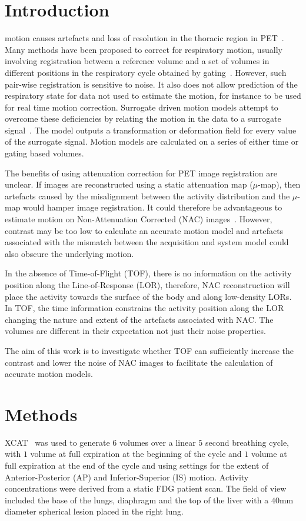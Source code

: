 \documentclass{IEEEtran}
\begin{document}
\section{Introduction}
 motion causes artefacts and loss of resolution in the thoracic region in PET~\cite{Nehmeh2008}. Many methods have been proposed to correct for respiratory motion, usually involving registration between a reference volume and a set of volumes in different positions in the respiratory cycle obtained by gating~\cite{Oliveira2014}. However, such pair-wise registration is sensitive to noise. It also does not allow prediction of the respiratory state for data not used to estimate the motion, for instance to be used for real time motion correction. Surrogate driven motion models attempt to overcome these deficiencies by relating the motion in the data to a surrogate signal~\cite{McClelland2013}. The model outputs a transformation or deformation field for every value of the surrogate signal. Motion models are calculated on a series of either time or gating based volumes.

The benefits of using attenuation correction for PET image registration are unclear. If images are reconstructed using a static attenuation map ($\mu$-map), then artefacts caused by the misalignment between the activity distribution and the $\mu$-map would hamper image registration. It could therefore be advantageous to estimate motion on Non-Attenuation Corrected (NAC) images~\cite{WenjiaBai2011}. However, contrast may be too low to calculate an accurate motion model and artefacts associated with the mismatch between the acquisition and system model could also obscure the underlying motion. 

In the absence of Time-of-Flight (TOF), there is no information on the activity position along the Line-of-Response (LOR), therefore, NAC reconstruction will place the activity towards the surface of the body and along low-density LORs. In TOF, the time information constrains the activity position along the LOR changing the nature and extent of the artefacts associated with NAC. The volumes are different in their expectation not just their noise properties.

The aim of this work is to investigate whether TOF can sufficiently increase the contrast and lower the noise of NAC images to facilitate the calculation of accurate motion models.

\section{Methods}
XCAT~\cite{Segars2010} was used to generate $6$ volumes over a linear $5$ second breathing cycle, with $1$ volume at full expiration at the beginning of the cycle and $1$ volume at full expiration at the end of the cycle and using settings for the extent of Anterior-Posterior (AP) and Inferior-Superior (IS) motion. Activity concentrations were derived from a static FDG patient scan. The field of view included the base of the lungs, diaphragm and the top of the liver with a $40$mm diameter spherical lesion placed in the right lung.
\end{document}
